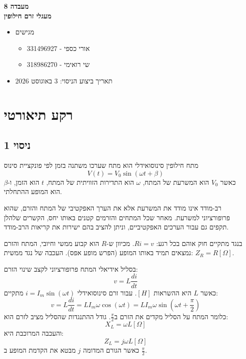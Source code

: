 \documentclass[14pt]{extarticle}
\begin{document}
\begin{center}
    {\LARGE \textbf{מעבדה 8}}\\
    {\textbf{מעגלי זרם חילופין}}
\end{center}

\begin{itemize}
    \item מגישים
    \begin{itemize}
        \item אורי כספי - 331496927 
        \item שי רואימי - 318986270
    \end{itemize}
    \item תאריך ביצוע הניסוי: 3 באוגוסט 2026
\end{itemize}
\newpage
\section*{רקע תיאורטי}

\subsection*{ניסוי 1}

מתח חילופין סינוסואידלי הוא מתח שערכו משתנה בזמן לפי פונקציית סינוס
\begin{equation}
    V(t) = V_0 \sin(\omega t + \beta)
\end{equation}
כאשר $V_0$ הוא המשרעת של המתח, $\omega$ הוא התדירות הזוויתית של המתח, $t$ הוא הזמן, ו-$\beta$ הוא המופע ההתחלתי.

רב-מודד אינו מודד את המשרעת אלא את הערך האפקטיבי של המתח והזרם, שהוא פרופורציוני למשרעת.
מאחר שכל המתחים והזרמים קטנים באותו יחס, הקשרים שלהלן תקפים גם עבור הערכים האפקטיביים, וניתן להציב בהם ישירות את קריאות הרב-מודד.

בנגד מתקיים חוק אוהם בכל רגע: $Ri=v$.
מכיוון ש-$R$ הוא קבוע ממשי וחיובי, המתח והזרם נמצאים תמיד באותו המופע (הפרש מופע אפס).
העכבה של נגד ממשית: $Z_R = R [\Omega]$.

בסליל אידיאלי המתח פרופורציוני לקצב שינוי הזרם:
\begin{equation}
    v = L \frac{di}{dt}
\end{equation}
כאשר $L$ היא ההשראות $[H]$.
עבור זרם סינוסואידלי $i=I_m \sin(\omega t)$ מתקיים:
\begin{equation}
    v = L \frac{di}{dt} = L I_m \omega \cos(\omega t) = L I_m \omega \sin(\omega t + \frac{\pi}{2})
\end{equation}
כלומר המתח על הסליל מקדים את הזרם ב$\frac{\pi}{2}$.
גודל ההתנגדות שהסליל מציב לזרם הוא:
\begin{equation}
    X_L = \omega L [\Omega]
\end{equation}
והעכבה המרוכבת היא:
\begin{equation}
    Z_L = j \omega L [\Omega]
\end{equation}
כאשר הגורם המדומה $j$ מבטא את הקדמת המופע ב $\frac{\pi}{2}$.
\end{document}
